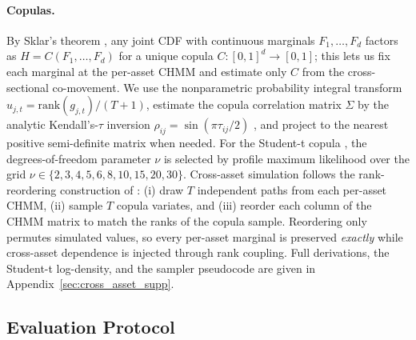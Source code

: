 \paragraph{Copulas.}
By Sklar's theorem \cite{sklar1959fonctions}, any joint CDF with continuous marginals $F_1, \dots, F_d$ factors as $H = C(F_1, \dots, F_d)$ for a unique copula $C : [0, 1]^d \to [0, 1]$; this lets us fix each marginal at the per-asset CHMM and estimate only $C$ from the cross-sectional co-movement.
We use the nonparametric probability integral transform $u_{j, t} = \text{rank}(g_{j, t}) / (T + 1)$, estimate the copula correlation matrix $\Sigma$ by the analytic Kendall's-$\tau$ inversion $\rho_{ij} = \sin(\pi \tau_{ij} / 2)$ \cite{embrechts2002correlation, mcneil2015quantitative}, and project to the nearest positive semi-definite matrix when needed.
For the Student-t copula \cite{demarta2005tcopula}, the degrees-of-freedom parameter $\nu$ is selected by profile maximum likelihood over the grid $\nu \in \{2, 3, 4, 5, 6, 8, 10, 15, 20, 30\}$.
Cross-asset simulation follows the rank-reordering construction of \citet{iman1982distribution}: (i) draw $T$ independent paths from each per-asset CHMM, (ii) sample $T$ copula variates, and (iii) reorder each column of the CHMM matrix to match the ranks of the copula sample.
Reordering only permutes simulated values, so every per-asset marginal is preserved \emph{exactly} while cross-asset dependence is injected through rank coupling.
Full derivations, the Student-t log-density, and the sampler pseudocode are given in Appendix~\ref{sec:cross_asset_supp}.

\subsection{Evaluation Protocol}
\label{sec:metrics}

